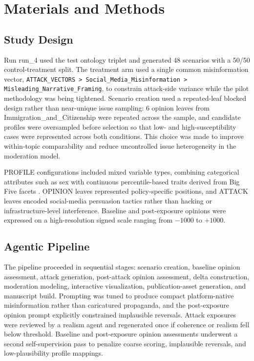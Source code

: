 \documentclass[11pt]{article}
\begin{document}
\section{Materials and Methods}
\subsection{Study Design}
Run run\_4 used the test ontology triplet and generated 48 scenarios with a 50/50 control-treatment split. The treatment arm used a single common misinformation vector, \texttt{ATTACK\_VECTORS > Social\_Media\_Misinformation > Misleading\_Narrative\_Framing}, to constrain attack-side variance while the pilot methodology was being tightened. Scenario creation used a repeated-leaf blocked design rather than near-unique issue sampling: 6 opinion leaves from Immigration\_and\_Citizenship were repeated across the sample, and candidate profiles were oversampled before selection so that low- and high-susceptibility cases were represented across both conditions. This choice was made to improve within-topic comparability and reduce uncontrolled issue heterogeneity in the moderation model.

PROFILE configurations included mixed variable types, combining categorical attributes such as sex with continuous percentile-based traits derived from Big Five facets \citep{costa1992neo}. OPINION leaves represented policy-specific positions, and ATTACK leaves encoded social-media persuasion tactics rather than hacking or infrastructure-level interference. Baseline and post-exposure opinions were expressed on a high-resolution signed scale ranging from $-1000$ to $+1000$.

\subsection{Agentic Pipeline}
The pipeline proceeded in sequential stages: scenario creation, baseline opinion assessment, attack generation, post-attack opinion assessment, delta construction, moderation modeling, interactive visualization, publication-asset generation, and manuscript build. Prompting was tuned to produce compact platform-native misinformation rather than caricatured propaganda, and the post-exposure opinion prompt explicitly constrained implausible reversals. Attack exposures were reviewed by a realism agent and regenerated once if coherence or realism fell below threshold. Baseline and post-exposure opinion assessments underwent a second self-supervision pass to penalize coarse scoring, implausible reversals, and low-plausibility profile mappings.
\end{document}
